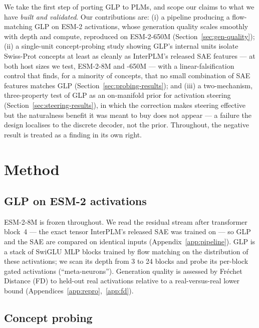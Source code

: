 \documentclass{article}
\begin{document}
We take the first step of porting GLP to PLMs, and scope our claims to what we have
\emph{built and validated}. Our contributions are: (i) a pipeline producing a flow-matching
GLP on ESM-2 activations, whose generation quality scales smoothly with depth and compute,
reproduced on ESM-2-650M (Section~\ref{sec:gen-quality}); (ii) a single-unit concept-probing
study showing GLP's internal units isolate Swiss-Prot concepts at least as cleanly as
InterPLM's released SAE features --- at both host sizes we test, ESM-2-8M and -650M --- with a
linear-falsification control that finds, for a minority of concepts, that no small combination
of SAE features matches GLP (Section~\ref{sec:probing-results}); and (iii) a two-mechanism,
three-property test of GLP as an on-manifold prior for activation steering
(Section~\ref{sec:steering-results}), in which the correction makes steering effective but the
naturalness benefit it was meant to buy does not appear --- a failure the design localises to
the discrete decoder, not the prior. Throughout, the negative result is treated as a finding in
its own right.

\section{Method}
\label{sec:method}

\subsection{GLP on ESM-2 activations}

ESM-2-8M is frozen throughout. We read the residual stream after transformer block~4 --- the
exact tensor InterPLM's released SAE was trained on --- so GLP and the SAE are compared on
identical inputs (Appendix~\ref{app:pipeline}). GLP is a stack of SwiGLU MLP blocks trained by
flow matching on the distribution of these activations; we scan its depth from 3 to 24 blocks
and probe its per-block gated activations (``meta-neurons''). Generation quality is assessed by
Fréchet Distance (FD) to held-out real activations relative to a real-versus-real lower bound
(Appendices~\ref{app:repro},~\ref{app:fd}).

\subsection{Concept probing}
\label{sec:method-probing}
\end{document}
